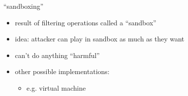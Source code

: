 \begin{frame}{``sandboxing''}
    \begin{itemize}
    \item result of filtering operations called a ``sandbox''
    \item idea: attacker can play in sandbox as much as they want
    \item can't do anything ``harmful''
    \vspace{.5cm}
    \item other possible implementations:
        \begin{itemize}
        \item e.g. virtual machine
        \end{itemize}
    \end{itemize}
\end{frame}


